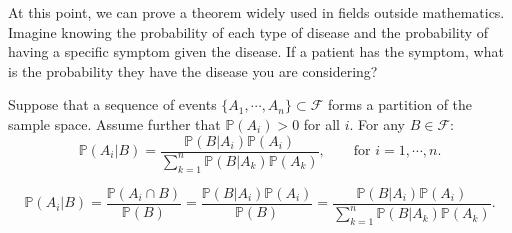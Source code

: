 \documentclass{huhtakm-template-book-v2}
\newcommand{\prob}{\mathbb{P}}
\begin{document}
    At this point, we can prove a theorem widely used in fields outside mathematics. Imagine knowing the probability of each type of disease and the probability of having a specific symptom given the disease. If a patient has the symptom, what is the probability they have the disease you are considering?
    \begin{thm}
        Suppose that a sequence of events $\{A_{1},\cdots,A_{n}\}\subset\mathcal{F}$ forms a partition of the sample space. Assume further that $\prob(A_{i}) > 0$ for all $i$. For any $B \in \mathcal{F}$:
        \begin{equation*}
            \prob(A_{i}|B) = \frac{\prob(B|A_{i})\prob(A_{i})}{\sum_{k = 1}^{n}\prob(B|A_{k})\prob(A_{k})}, \qquad\text{for }i = 1,\cdots,n.
        \end{equation*}
    \end{thm}
    \begin{proofing}
        \begin{equation*}
            \prob(A_{i}|B) = \frac{\prob(A_{i}\cap B)}{\prob(B)} = \frac{\prob(B|A_{i})\prob(A_{i})}{\prob(B)} = \frac{\prob(B|A_{i})\prob(A_{i})}{\sum_{k = 1}^{n}\prob(B|A_{k})\prob(A_{k})}.
        \end{equation*}
    \end{proofing}
    \newpage
\end{document}
